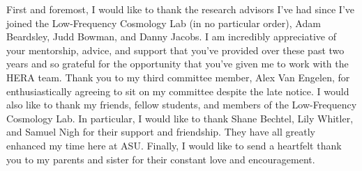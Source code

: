 First and foremost, I would like to thank the research advisors I've had since
I've joined the Low-Frequency Cosmology Lab (in no particular order), Adam Beardsley,
Judd Bowman, and Danny Jacobs. I am incredibly appreciative of your mentorship,
advice, and support that you've provided over these past two years and so grateful for the
opportunity that you've given me to work with the HERA team.
Thank you to my third committee member, Alex Van Engelen, for enthusiastically
agreeing to sit on my committee despite the late notice.
I would also like to thank my friends, fellow students, and members of the
Low-Frequency Cosmology Lab. In particular, I would like to
thank Shane Bechtel, Lily Whitler, and Samuel Nigh for their support and friendship.
They have all greatly enhanced my time here at ASU. Finally, I would like to send
a heartfelt thank you to my parents and sister for their constant love and encouragement.

\clearpage
